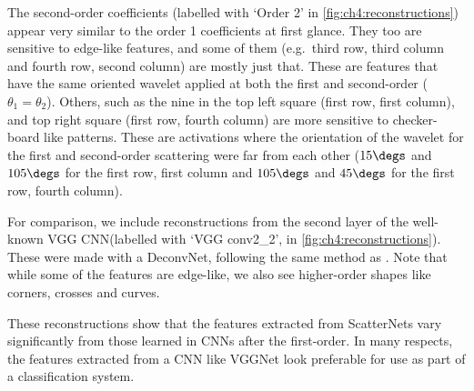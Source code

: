 {The second-order coefficients (labelled with `Order
2' in \autoref{fig:ch4:reconstructions}) appear very similar to the order
1 coefficients at first glance.
They too are sensitive to edge-like features, and some of them (e.g.\ third row,
third column and fourth row, second column) are mostly just that. These are
features that have the same oriented wavelet applied at both the first and
second-order ($\theta_1 = \theta_2$). Others, such as the nine in the top left
square (first row, first column), and top right square (first row, fourth
column) are more sensitive to checker-board like patterns. These are
activations where the orientation of the wavelet for the first and second-order
scattering were far from each other ($15\degs$ and $105\degs$ for the first row,
first column and $105\degs$ and $45\degs$ for the first row, fourth column).

For comparison, we include reconstructions from the second layer of the
well-known VGG CNN\@ (labelled with `VGG conv2\_2', in
\autoref{fig:ch4:reconstructions}). These were made with a DeconvNet, following the
same method as \cite{zeiler_visualizing_2014}. Note that while some of
the features are edge-like, we also see higher-order shapes like corners,
crosses and curves.

These reconstructions show that the features extracted from ScatterNets vary
significantly from those learned in CNNs after the first-order. In many
respects, the features extracted from a CNN like VGGNet look preferable for use
as part of a classification system.
}
